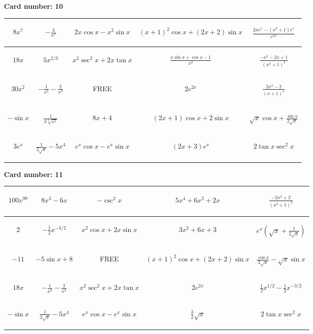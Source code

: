 \documentclass{article}
\newcommand{\entry}[1]{\begin{minipage}[t][2.75cm][t]{4cm} \vspace{1cm} \begin{center}#1\end{center} \end{minipage}}
\newcommand{\freespace}{\entry{FREE}}
\newcommand{\cardnumber}[1]{\noindent \textbf{Card number: #1} \bigskip}
\begin{document}
\pagebreak

\cardnumber{10}
\begin{center}
\begin{tabular}{|*{5}{c|}}
    \hline
    \entry{$8x^7$} & \entry{$-\frac{3}{x^2}$} & \entry{$2x \cos x - x^2 \sin x$} & \entry{$(x + 1)^2 \cos x + (2x + 2) \sin x$} & \entry{$\frac{2x e^x - (x^2 + 1) e^x}{e^{2x}}$} \\ \hline
    \entry{$18x$} & \entry{$5x^{2/3}$} & \entry{$x^2 \sec^2 x + 2x \tan x$} & \entry{$\frac{x \sin x + \cos x - 1}{x^2}$} & \entry{$\frac{-x^2 - 2x + 1}{(x^2 + 1)^2}$} \\ \hline
    \entry{$30x^2$} & \entry{$-\frac{1}{x^2} - \frac{2}{x^3}$} & \freespace & \entry{$2e^{2x}$} & \entry{$\frac{2x^2 - 2}{(x + 1)^4}$} \\ \hline
    \entry{$-\sin x$} & \entry{$\frac{1}{3\sqrt[3]{x^2}}$} & \entry{$8x + 4$} & \entry{$(2x + 1) \cos x + 2 \sin x$} & \entry{$\sqrt{x} \cos x + \frac{\sin x}{2 \sqrt{x}}$} \\ \hline
    \entry{$3e^x$} & \entry{$\frac{1}{2\sqrt{x}} - 5x^4$} & \entry{$e^x \cos x - e^x \sin x$} & \entry{$(2x + 3) e^x$} & \entry{$2 \tan x \sec^2 x$} \\ \hline
\end{tabular}
\end{center}

\pagebreak

\cardnumber{11}
\begin{center}
\begin{tabular}{|*{5}{c|}}
    \hline
    \entry{$100x^{99}$} & \entry{$8x^3 - 6x$} & \entry{$-\csc^2 x$} & \entry{$5x^4 + 6x^2 + 2x$} & \entry{$\frac{-2x^2 + 2}{(x^2 + 1)^2}$} \\ \hline
    \entry{$2$} & \entry{$-\frac{1}{2} x^{-3/2}$} & \entry{$x^2 \cos x + 2x \sin x$} & \entry{$3x^2 + 6x + 3$} & \entry{$e^x \left(\sqrt{x} + \frac{1}{2\sqrt{x}}\right)$} \\ \hline
    \entry{$-11$} & \entry{$-5 \sin x + 8$} & \freespace & \entry{$(x + 1)^2 \cos x + (2x + 2) \sin x$} & \entry{$\frac{\cos x}{2 \sqrt{x}} - \sqrt{x} \sin x$} \\ \hline
    \entry{$18x$} & \entry{$-\frac{1}{x^2} - \frac{2}{x^3}$} & \entry{$x^2 \sec^2 x + 2x \tan x$} & \entry{$2e^{2x}$} & \entry{$\frac{1}{2} x^{1/2} - \frac{1}{2} x^{-3/2}$} \\ \hline
    \entry{$-\sin x$} & \entry{$\frac{1}{2\sqrt{x}} - 5x^4$} & \entry{$e^x \cos x - e^x \sin x$} & \entry{$\frac{3}{2} \sqrt{x}$} & \entry{$2 \tan x \sec^2 x$} \\ \hline
\end{tabular}
\end{center}
\end{document}
